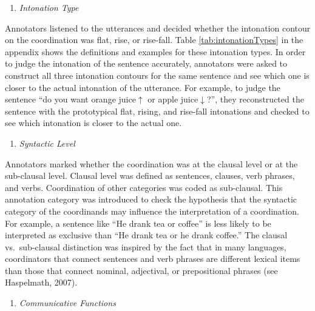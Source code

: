 \documentclass[,man,floatsintext]{apa6}
\providecommand{\tightlist}{%
  \setlength{\itemsep}{0pt}\setlength{\parskip}{0pt}}
\begin{document}
\begin{enumerate}
\def\labelenumi{\arabic{enumi}.}
\setcounter{enumi}{3}
\tightlist
\item
  \emph{Intonation Type}
\end{enumerate}

Annotators listened to the utterances and decided whether the intonation contour on the coordination was flat, rise, or rise-fall. Table \ref{tab:intonationTypes} in the appendix shows the definitions and examples for these intonation types. In order to judge the intonation of the sentence accurately, annotators were asked to construct all three intonation contours for the same sentence and see which one is closer to the actual intonation of the utterance. For example, to judge the sentence \enquote{do you want orange juice\(\uparrow\) or apple juice\(\downarrow\)?}, they reconstructed the sentence with the prototypical flat, rising, and rise-fall intonations and checked to see which intonation is closer to the actual one.

\begin{enumerate}
\def\labelenumi{\arabic{enumi}.}
\setcounter{enumi}{4}
\tightlist
\item
  \emph{Syntactic Level}
\end{enumerate}

Annotators marked whether the coordination was at the clausal level or at the sub-clausal level. Clausal level was defined as sentences, clauses, verb phrases, and verbs. Coordination of other categories was coded as sub-clausal. This annotation category was introduced to check the hypothesis that the syntactic category of the coordinands may influence the interpretation of a coordination. For example, a sentence like \enquote{He drank tea or coffee} is less likely to be interpreted as exclusive than \enquote{He drank tea or he drank coffee.} The clausal vs.~sub-clausal distinction was inspired by the fact that in many languages, coordinators that connect sentences and verb phrases are different lexical items than those that connect nominal, adjectival, or prepositional phrases (see Haspelmath, 2007).

\begin{enumerate}
\def\labelenumi{\arabic{enumi}.}
\setcounter{enumi}{5}
\tightlist
\item
  \emph{Communicative Functions}
\end{enumerate}
\end{document}
